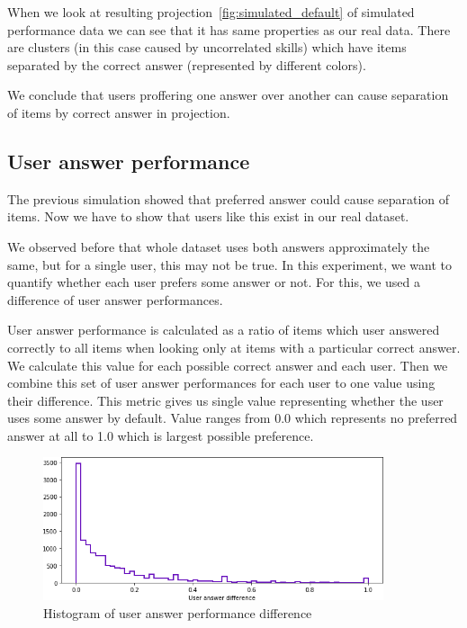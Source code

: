 \documentclass[
  printed, %
  table,   %
  nolof,     %
  nolot,     %
  color,
  final,
  nocover
]{fithesis3}
\begin{document}
When we look at resulting projection~\ref{fig:simulated_default} of simulated performance data we can see that it has same properties as our real data. There are clusters (in this case caused by uncorrelated skills) which have items separated by the correct answer (represented by different colors).

We conclude that users proffering one answer over another can cause separation of items by correct answer in projection.


\subsection{User answer performance}\label{user-answer-performance}


The previous simulation showed that preferred answer could cause separation of items. Now we have to show that users like this exist in our real dataset.

We observed before that whole dataset uses both answers approximately the same, but for a single user, this may not be true. In this experiment, we want to quantify whether each user prefers some answer or not. For this, we used a difference of user answer performances.

User answer performance is calculated as a ratio of items which user answered correctly to all items when looking only at items with a particular correct answer. We calculate this value for each possible correct answer and each user. Then we combine this set of user answer performances for each user to one value using their difference. This metric gives us single value representing whether the user uses some answer by default. Value ranges from 0.0 which represents no preferred answer at all to 1.0 which is largest possible preference.

\begin{figure}
  \includegraphics[width=10cm]{img/uneven_answers_hist}
  \caption{Histogram of user answer performance difference}
  \label{fig:uneven_answers_hist}
\end{figure}
\end{document}
